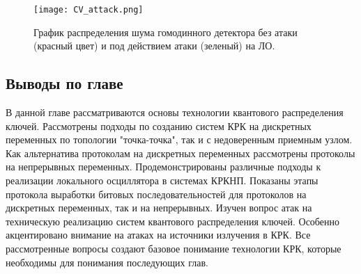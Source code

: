 \begin{figure}
    \centering
    \texttt{[image: CV\_attack.png]}
    \caption{График распределения шума гомодинного детектора без атаки (красный цвет) и под действием атаки (зеленый) на ЛО.}
    \label{fig:CV_attack}
\end{figure}
\subsection{Выводы по главе}\label{sec:ch1/sect8}
В данной главе рассматриваются основы технологии квантового распределения ключей. Рассмотрены подходы по созданию систем КРК на дискретных переменных по топологии "точка-точка", так и с недоверенным приемным узлом. Как альтернатива протоколам на дискретных переменных рассмотрены протоколы на непрерывных переменных. Продемонстрированы  различные подходы к реализации локального осциллятора в системах КРКНП. Показаны этапы протокола выработки битовых последовательностей для протоколов на дискретных переменных, так и на непрерывных.
Изучен вопрос атак на техническую реализацию систем квантового распределения ключей. Особенно акцентировано внимание на атаках на источники излучения в КРК. Все рассмотренные вопросы создают базовое понимание технологии КРК, которые необходимы для понимания последующих глав.